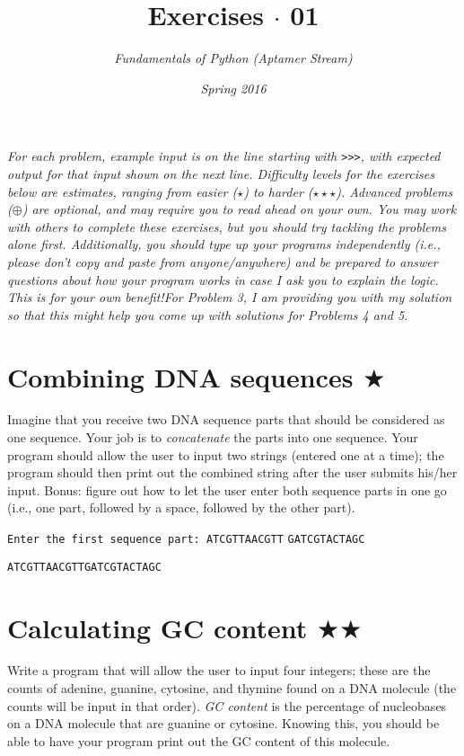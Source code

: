 \documentclass[12pt, letterpaper]{article}
\title{Exercises $\cdot$ 01}
\author{\textit{Fundamentals of Python (Aptamer Stream)}}
\date{\textit{Spring 2016}}
\begin{document}
\maketitle
\textit{For each problem, example input is on the line starting with \texttt{>{>}>}, with expected output for that input shown on the next line. Difficulty levels for the exercises below are estimates, ranging from easier ($\star$) to harder ($\star\star\star$). Advanced problems ($\oplus$) are optional, and may require you to read ahead on your own. You may work with others to complete these exercises, but you should try tackling the problems alone first. Additionally, you should type up your programs independently (i.e., please don't copy and paste from anyone/anywhere) and be prepared to answer questions about how your program works in case I ask you to explain the logic. This is for your own benefit!\newline For Problem 3, I am providing you with my solution so that this might help you come up with solutions for Problems 4 and 5.}


\section{\upshape Combining DNA sequences $\bigstar$}
Imagine that you receive two DNA sequence parts that should be considered as one sequence. Your job is to \emph{concatenate} the parts into one sequence. Your program should allow the user to input two strings (entered one at a time); the program should then print out the combined string after the user submits his/her input. Bonus: figure out how to let the user enter both sequence parts in one go (i.e., one part, followed by a space, followed by the other part).

\texttt{Enter the first sequence part: ATCGTTAACGTT}
\texttt{GATCGTACTAGC}

\texttt{ATCGTTAACGTTGATCGTACTAGC}

\section{\upshape Calculating GC content $\bigstar\bigstar$}
Write a program that will allow the user to input four integers; these are the counts of adenine, guanine, cytosine, and thymine found on a DNA molecule (the counts will be input in that order). \emph{GC content} is the percentage of nucleobases on a DNA molecule that are guanine or cytosine. Knowing this, you should be able to have your program print out the GC content of this molecule.
\end{document}
